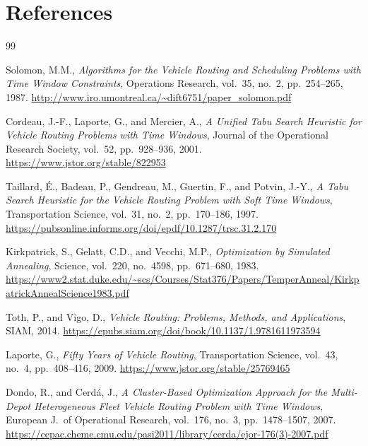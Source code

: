 \documentclass[11pt,a4paper]{article}
\begin{document}
\newpage
\section*{References}

\begin{thebibliography}{99}

Solomon, M.M.,
\textit{Algorithms for the Vehicle Routing and Scheduling Problems with Time Window Constraints},
Operations Research, vol.~35, no.~2, pp.~254--265, 1987.
\url{http://www.iro.umontreal.ca/~dift6751/paper_solomon.pdf}

Cordeau, J.-F., Laporte, G., and Mercier, A.,
\textit{A Unified Tabu Search Heuristic for Vehicle Routing Problems with Time Windows},
Journal of the Operational Research Society, vol.~52, pp.~928--936, 2001.
\url{https://www.jstor.org/stable/822953}

Taillard, \'E., Badeau, P., Gendreau, M., Guertin, F., and Potvin, J.-Y.,
\textit{A Tabu Search Heuristic for the Vehicle Routing Problem with Soft Time Windows},
Transportation Science, vol.~31, no.~2, pp.~170--186, 1997.
\url{https://pubsonline.informs.org/doi/epdf/10.1287/trsc.31.2.170}

Kirkpatrick, S., Gelatt, C.D., and Vecchi, M.P.,
\textit{Optimization by Simulated Annealing},
Science, vol.~220, no.~4598, pp.~671--680, 1983.
\url{https://www2.stat.duke.edu/~scs/Courses/Stat376/Papers/TemperAnneal/KirkpatrickAnnealScience1983.pdf}

Toth, P., and Vigo, D.,
\textit{Vehicle Routing: Problems, Methods, and Applications},
SIAM, 2014.
\url{https://epubs.siam.org/doi/book/10.1137/1.9781611973594}

Laporte, G.,
\textit{Fifty Years of Vehicle Routing},
Transportation Science, vol.~43, no.~4, pp.~408--416, 2009.
\url{https://www.jstor.org/stable/25769465}

Dondo, R., and Cerd\'a, J.,
\textit{A Cluster-Based Optimization Approach for the Multi-Depot Heterogeneous Fleet Vehicle Routing Problem with Time Windows},
European J.\ of Operational Research, vol.~176, no.~3, pp.~1478--1507, 2007.
\url{https://cepac.cheme.cmu.edu/pasi2011/library/cerda/ejor-176(3)-2007.pdf}


\end{thebibliography}
\end{document}
